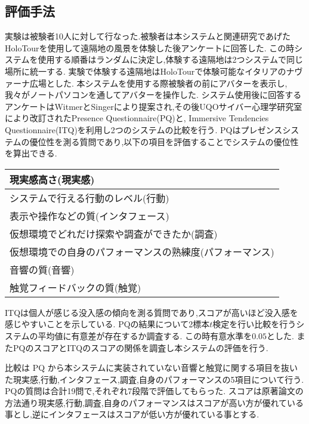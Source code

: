 \subsection{評価手法}
実験は被験者10人に対して行なった.被験者は本システムと関連研究であげたHoloTourを使用して遠隔地の風景を体験した後アンケートに回答した.
この時システムを使用する順番はランダムに決定し,体験する遠隔地は2つシステムで同じ場所に統一する.
実験で体験する遠隔地はHoloTourで体験可能なイタリアのナヴァーナ広場とした.
本システムを使用する際被験者の前にアバターを表示し, 我々がノートパソコンを通してアバターを操作した.
システム使用後に回答するアンケートはWitmerとSingerにより提案され,その後UQOサイバー心理学研究室により改訂されたPresence Questionnaire(PQ)と, Immersive Tendencies Questionnaire(ITQ)を利用し2つのシステムの比較を行う\cite{pq}\cite{itq}.
PQはプレゼンスシステムの優位性を測る質問であり,以下の項目を評価することでシステムの優位性を算出できる.

\begin{table}[ht]
 \begin{center}
  \begin{tabular}{| l |}
  \hline
 現実感高さ(現実感) \\ \hline
システムで行える行動のレベル(行動) \\ \hline
 表示や操作などの質(インタフェース) \\ \hline
 仮想環境でどれだけ探索や調査ができたか(調査)\\ \hline
 仮想環境での自身のパフォーマンスの熟練度(パフォーマンス)\\ \hline
 音響の質(音響)\\ \hline
 触覚フィードバックの質(触覚)\\ \hline
  \end{tabular}
  \end{center}
\end{table}
ITQは個人が感じる没入感の傾向を測る質問であり,スコアが高いほど没入感を感じやすいことを示している.
PQの結果について2標本$t$検定を行い比較を行うシステムの平均値に有意差が存在するか調査する.
この時有意水準を$0.05$とした.
またPQのスコアとITQのスコアの関係を調査し本システムの評価を行う.

比較は PQ から本システムに実装されていない音響と触覚に関する項目を抜いた現実感,行動,インタフェース,調査,自身のパフォーマンスの5項目について行う.
PQの質問は合計19問で,それぞれ7段階で評価してもらった.
スコアは原著論文の方法通り現実感,行動,調査,自身のパフォーマンスはスコアが高い方が優れている事とし,逆にインタフェースはスコアが低い方が優れている事とする.

\clearpage